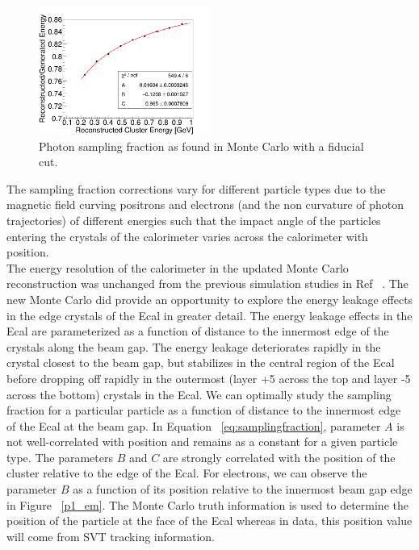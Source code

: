 \documentclass[twoside]{article}
\begin{document}
\begin{multicols}{2}
\begin{figure}[H]
  \centering
      \includegraphics[width=0.5\textwidth]{pics/fidSF_p.png}
  \caption{Photon sampling fraction as found in Monte Carlo with a fiducial cut.}
  \label{mcsf_p}
\end{figure} 

The sampling fraction corrections vary for different particle types due to the magnetic field curving positrons and electrons (and the non curvature of photon trajectories) of different energies such that the impact angle of the particles entering the crystals of the calorimeter varies across the calorimeter with position.\\
The energy resolution of the calorimeter in the updated Monte Carlo reconstruction was unchanged from the previous simulation studies in Ref ~\cite{Garcon}. The new Monte Carlo did provide an opportunity to explore the energy leakage effects in the edge crystals of the Ecal in greater detail. The energy leakage effects in the Ecal are parameterized as a function of distance to the innermost edge of the crystals along the beam gap. The energy leakage deteriorates rapidly in the crystal closest to the beam gap, but stabilizes in the central region of the Ecal before dropping off rapidly in the outermost (layer +5 across the top and layer -5 across the bottom) crystals in the Ecal. We can optimally study the sampling fraction for a particular particle as a function of distance to the innermost edge of the Ecal at the beam gap. In Equation ~\ref{eq:samplingfraction}, parameter $A$ is not well-correlated with position and remains as a constant for a given particle type. The parameters $B$ and $C$ are strongly correlated with the position of the cluster relative to the edge of the Ecal. For electrons, we can observe the parameter $B$ as a function of its position relative to the innermost beam gap edge in Figure ~\ref{p1_em}. The Monte Carlo truth information is used to determine the position of the particle at the face of the Ecal whereas in data, this position value will come from SVT tracking information. 


\end{multicols}
\end{document}
